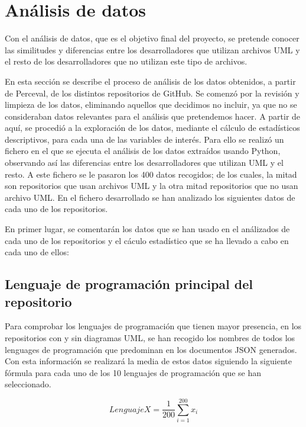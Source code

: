 \documentclass[a4paper, 12pt]{book}
\begin{document}
\section{Análisis de datos} %
\label{sec:análisis de datos}

Con el análisis de datos, que es el objetivo final del proyecto, se pretende conocer las similitudes y diferencias entre los desarrolladores que utilizan archivos UML y el resto de los desarrolladores que no utilizan este tipo de archivos.


En esta sección se describe el proceso de análisis de los datos obtenidos, a partir de Perceval, de los distintos repositorios de GitHub. 
Se comenzó por la revisión y limpieza de los datos, eliminando aquellos que decidimos no incluir, ya que no se consideraban datos relevantes para el análisis que pretendemos hacer. 
A partir de aquí, se procedió a la exploración de los datos, mediante el cálculo de estadísticos descriptivos, para cada una de las variables de interés. 
Para ello se realizó un fichero en el que se ejecuta el análisis de los datos extraídos usando Python, observando así las diferencias entre los desarrolladores que utilizan UML y el resto.
A este fichero se le pasaron los 400 datos recogidos; de los cuales, la mitad son repositorios que usan archivos UML y la otra mitad repositorios que no usan archivo UML. 
En el fichero desarrollado se han analizado los siguientes datos de cada uno de los repositorios. 


En primer lugar, se comentarán los datos que se han usado en el análizados de cada uno de los repositorios y el cáculo estadístico que se ha llevado a cabo en cada uno de ellos:


\subsection{Lenguaje de programación principal del repositorio} %
\label{sec:lenguaje de programación principal del repositorio}
Para comprobar los lenguajes de programación que tienen mayor presencia, en los repositorios con y sin diagramas UML, se han recogido los nombres de todos los lenguages de programación que predominan en los documentos JSON generados.
Con esta información se realizará la media de estos datos siguiendo la siguiente fórmula para cada uno de los 10 lenguajes de programación que se han seleccionado.


\[{Lenguaje X} = \frac{1}{200} \sum_{i=1}^{200} x_i\]
\end{document}
